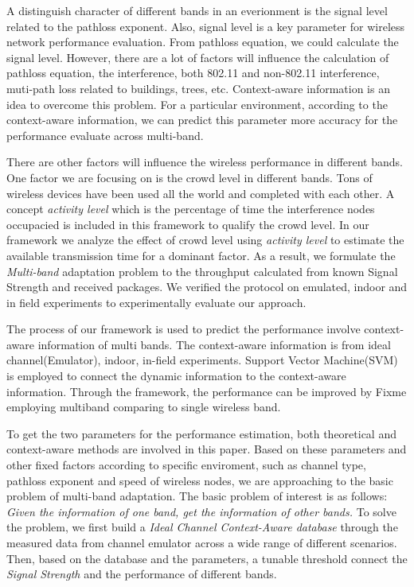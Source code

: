 A distinguish character of different bands in an everionment is the signal level related to the pathloss exponent. Also, signal level is a key parameter for wireless network performance evaluation. From pathloss equation, we could calculate the signal level. However, there are a lot of factors will influence the calculation of pathloss equation, the interference, both 802.11 and non-802.11 interference, muti-path loss related to buildings, trees, etc.
Context-aware information is an idea to overcome this problem. For a particular environment, according to the context-aware information, we can predict this parameter more accuracy for the performance evaluate across multi-band.


There are other factors will influence the wireless performance in different bands. One factor we are focusing on is the crowd level in different bands. Tons of wireless devices have been used all the world and completed with each other. 
A concept \emph{activity level} which is the percentage of time the interference nodes occupacied is included in this framework to qualify the crowd level. 
In our framework we analyze the effect of crowd level using \emph{activity level} to estimate the available transmission time for a dominant factor. As a result, we formulate the \emph{Multi-band} adaptation problem to the throughput calculated from known Signal Strength and received packages. We verified the protocol on emulated, indoor and in field experiments to experimentally evaluate our approach. 

The process of our framework is used to predict the performance involve context-aware information of multi bands. The context-aware information is from ideal channel(Emulator), indoor, in-field experiments. Support Vector Machine(SVM) is employed to connect the dynamic information to the context-aware information.  
Through the framework, the performance can be improved by Fixme employing multiband comparing to single wireless band.


To get the two parameters for the performance estimation, both theoretical and context-aware methods are involved in this paper. Based on these parameters and other fixed factors according to specific enviroment, such as channel type, pathloss exponent and speed of wireless nodes, we are approaching to the basic problem of multi-band adaptation. 
The basic problem of interest is as follows: \emph{Given the information of one band, get the information of other bands.}
To solve the problem, 
we first build a \emph{Ideal Channel Context-Aware database} through the measured data from channel emulator across a wide range of different scenarios. 
Then, based on the database and the parameters, a tunable threshold connect the \emph{Signal Strength} and the performance of different bands.

